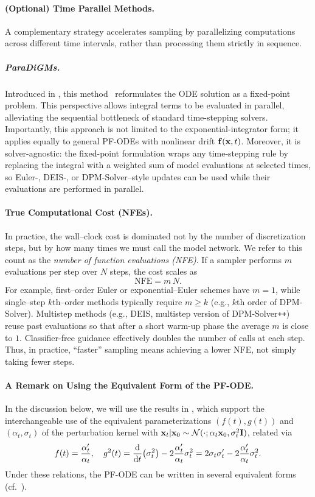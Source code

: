 \paragraph{(Optional) Time Parallel Methods.}  
A complementary strategy accelerates sampling by parallelizing computations across different time intervals, rather than processing them strictly in sequence.  

\subparagraph{ParaDiGMs.}  
Introduced in , this method~\citep{shih2023parallel} reformulates the ODE solution as a fixed-point problem. This perspective allows integral terms to be evaluated in parallel, alleviating the sequential bottleneck of standard time-stepping solvers. Importantly, this approach is not limited to the exponential-integrator form; it applies equally to general PF-ODEs with nonlinear drift ${\mathbf{f}}({\mathbf{x}},t)$. Moreover, it is solver-agnostic: the fixed-point formulation wraps any time-stepping rule by replacing the integral with a weighted sum of model evaluations at selected times, so Euler-, DEIS-, or DPM-Solver–style updates can be used while their evaluations are performed in parallel.





\paragraph{True Computational Cost (NFEs).}
In practice, the wall–clock cost is dominated not by the number of discretization steps, but by how many
times we must call the model network. We refer to this count as the \emph{number of function evaluations
(NFE)}. If a sampler performs $m$ evaluations per step over $N$ steps, the cost scales as
\[
\mathrm{NFE} = m\,N.
\]
For example, first–order Euler or exponential–Euler schemes have $m=1$, while single–step
$k$th–order methods typically require $m\geq k$ (e.g., $k$th order of DPM-Solver). Multistep methods (e.g., DEIS, multistep version of DPM-Solver\texttt{++})
reuse past evaluations so that after a short warm-up phase the average $m$ is close to $1$.
Classifier-free guidance effectively doubles the number of calls at each step. 
Thus, in practice, ``faster'' sampling means achieving a lower NFE, not simply taking fewer steps.



\paragraph{A Remark on Using the Equivalent Form of the PF-ODE.} 
In the discussion below, we will use the results in , which support the interchangeable use of the equivalent parameterizations $(f(t), g(t))$ and $(\alpha_t,\sigma_t)$ of the perturbation kernel with 
${\mathbf{x}}_t | {\mathbf{x}}_0 \sim \mathcal{N}(\cdot;\alpha_t {\mathbf{x}}_0,\sigma_t^2{\mathbf{I}})$, related via
\[
f(t) = \frac{\alpha_t'}{\alpha_t}, 
\quad
g^2(t) = \frac{\mathop{}\!\mathrm{d}}{\mathop{}\!\mathrm{d} t} \big(\sigma_t^2\big) 
         - 2 \frac{\alpha_t'}{\alpha_t} \sigma_t^2
       = 2\sigma_t\sigma_t' - 2 \frac{\alpha_t'}{\alpha_t} \sigma_t^2.
\]
Under these relations, the PF-ODE can be written in several equivalent forms (cf.\ ).


